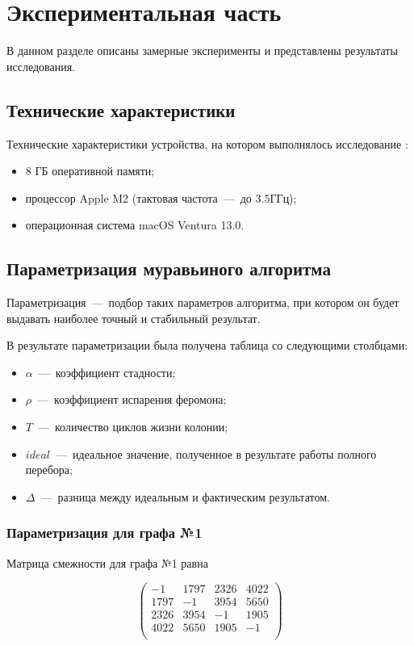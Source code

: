 \chapter{Экспериментальная часть}

В данном разделе описаны замерные эксперименты и представлены результаты исследования.

\section{Технические характеристики}
Технические характеристики устройства, на котором выполнялось исследование \cite{bib:5}:
\begin{itemize}
	\item 8 ГБ оперативной памяти;
	\item процессор Apple M2 (тактовая частота~---~до $3.5$ГГц);
    \item операционная система macOS Ventura 13.0.
\end{itemize}

\section{Параметризация муравьиного алгоритма}
Параметризация~---~подбор таких параметров алгоритма, при котором он будет выдавать наиболее точный и стабильный результат. 

В результате параметризации была получена таблица со следующими столбцами:

\begin{itemize}
	\item $\alpha$~---~коэффициент стадности;
	\item $\rho$~---~коэффициент испарения феромона;
	\item $T$~---~количество циклов жизни колонии;
	\item $ideal$~---~идеальное значение, полученное в результате работы полного перебора;
	\item $\Delta$~---~разница между идеальным и фактическим результатом.
\end{itemize}

\newpage

\subsection{Параметризация для графа №1}
Матрица смежности для графа №1 равна

\begin{equation}
	\begin{pmatrix}
	  -1 & 1797 & 2326 & 4022 \\ 
1797 & -1 & 3954 & 5650 \\ 
2326 & 3954 & -1 & 1905 \\ 
4022 & 5650 & 1905 & -1 \\
	  \end{pmatrix}
\end{equation}

